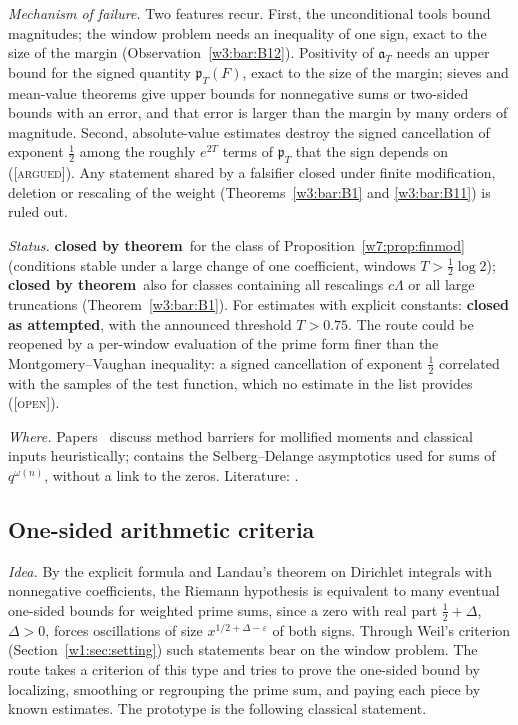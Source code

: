\documentclass[11pt]{amsart}
\theoremstyle{definition}
\theoremstyle{remark}
\numberwithin{equation}{section}
\newcommand{\pT}{\mathfrak{p}_T}                       %
\newcommand{\aT}{\mathfrak{a}_T}                       %
\newcommand{\stag}[1]{\textsc{[#1]}}
\newcommand{\ARGUED}{\stag{argued}}
\newcommand{\OPENQ}{\stag{open}}
\newcommand{\rtag}[1]{\textbf{\small\textsf{#1}}}
\newcommand{\closedT}{\rtag{closed by theorem}}
\newcommand{\closedA}{\rtag{closed as attempted}}
\newcommand{\entry}[1]{\par\smallskip\noindent\textit{#1.}\enspace}
\begin{document}
\entry{Mechanism of failure} Two features recur. First, the unconditional tools bound magnitudes; the window
problem needs an inequality of one sign, exact to the size of the margin
(Observation~\ref{w3:bar:B12}). Positivity of $\aT$ needs an upper bound for the signed quantity $\pT(F)$,
exact to the size of the margin; sieves and mean-value theorems give upper bounds for nonnegative sums or
two-sided bounds with an error, and that error is larger than the margin by many orders of magnitude. Second, absolute-value estimates destroy the signed
cancellation of exponent $\frac12$ among the roughly $e^{2T}$ terms of $\pT$ that the sign depends on (\ARGUED).
Any statement shared by a falsifier closed under finite modification, deletion or rescaling of the weight
(Theorems~\ref{w3:bar:B1} and \ref{w3:bar:B11}) is ruled out.

\entry{Status} \closedT\ for the class of Proposition~\ref{w7:prop:finmod} (conditions stable under a large
change of one coefficient, windows $T>\frac12\log2$); \closedT\ also for classes containing all rescalings
$c\Lambda$ or all large truncations (Theorem~\ref{w3:bar:B1}). For estimates with explicit constants:
\closedA, with the announced threshold $T>0.75$. The route could be reopened by a per-window evaluation of the
prime form finer than the Montgomery--Vaughan inequality: a signed cancellation of exponent $\frac12$
correlated with the samples of the test function, which no estimate in the list provides (\OPENQ).

\entry{Where} Papers~\cite{P33,P34} discuss method barriers for mollified moments and classical inputs
heuristically; \cite{P21} contains the Selberg--Delange asymptotics used for sums of $q^{\omega(n)}$, without a
link to the zeros. Literature: \cite{Ingham1932,Titchmarsh1986,MontgomeryVaughan1973,MontgomeryVaughan1974,
Vaughan1977,Ford2002,Montgomery1973}.

\subsection{One-sided arithmetic criteria}\label{w7:fam:R18}

\entry{Idea} By the explicit formula and Landau's theorem on Dirichlet integrals with nonnegative
coefficients, the Riemann hypothesis is equivalent to many eventual one-sided bounds for weighted prime sums,
since a zero with real part $\frac12+\Delta$, $\Delta>0$, forces oscillations of size $x^{1/2+\Delta-\varepsilon}$
of both signs. Through Weil's criterion (Section~\ref{w1:sec:setting}) such statements bear on the window
problem. The route takes a criterion of this type and tries to prove the one-sided bound by localizing,
smoothing or regrouping the prime sum, and paying each piece by known estimates. The prototype is the
following classical statement.
\end{document}
